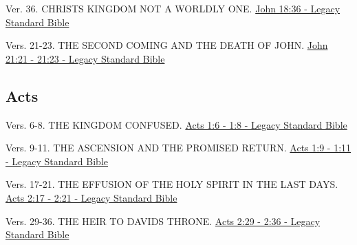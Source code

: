 \documentclass[
  ignorenonframetext,
]{beamer}
\begin{document}
\begin{frame}{18}
\label{section-184}
\begin{block}{Ver. 36. CHRIST\textquotesingle S KINGDOM NOT A WORLDLY
ONE.}
\label{ver.-36.-christs-kingdom-not-a-worldly-one.}
\href{https://read.lsbible.org/?q=john18\%3A36}{John 18:36 - Legacy
Standard Bible}
\end{block}
\end{frame}

\begin{frame}{21}
\label{section-185}
\begin{block}{Vers. 21-23. THE SECOND COMING AND THE DEATH OF JOHN.}
\label{vers.-21-23.-the-second-coming-and-the-death-of-john.}
\href{https://read.lsbible.org/?q=john21\%3A21-23}{John 21:21 - 21:23 -
Legacy Standard Bible}
\end{block}
\end{frame}

\subsection{Acts}\label{acts}

\begin{frame}{1}
\label{section-186}
\begin{block}{Vers. 6-8. THE KINGDOM CONFUSED.}
\label{vers.-6-8.-the-kingdom-confused.}
\href{https://read.lsbible.org/?q=acts1\%3A6-8}{Acts 1:6 - 1:8 - Legacy
Standard Bible}
\end{block}

\begin{block}{Vers. 9-11. THE ASCENSION AND THE PROMISED RETURN.}
\label{vers.-9-11.-the-ascension-and-the-promised-return.}
\href{https://read.lsbible.org/?q=acts1\%3A9-11}{Acts 1:9 - 1:11 -
Legacy Standard Bible}
\end{block}
\end{frame}

\begin{frame}{2}
\label{section-187}
\begin{block}{Vers. 17-21. THE EFFUSION OF THE HOLY SPIRIT IN THE LAST
DAYS.}
\label{vers.-17-21.-the-effusion-of-the-holy-spirit-in-the-last-days.}
\href{https://read.lsbible.org/?q=acts2\%3A17-21}{Acts 2:17 - 2:21 -
Legacy Standard Bible}
\end{block}

\begin{block}{Vers. 29-36. THE HEIR TO DAVID\textquotesingle S THRONE.}
\label{vers.-29-36.-the-heir-to-davids-throne.}
\href{https://read.lsbible.org/?q=acts2\%3A29-36}{Acts 2:29 - 2:36 -
Legacy Standard Bible}
\end{block}
\end{frame}
\end{document}
